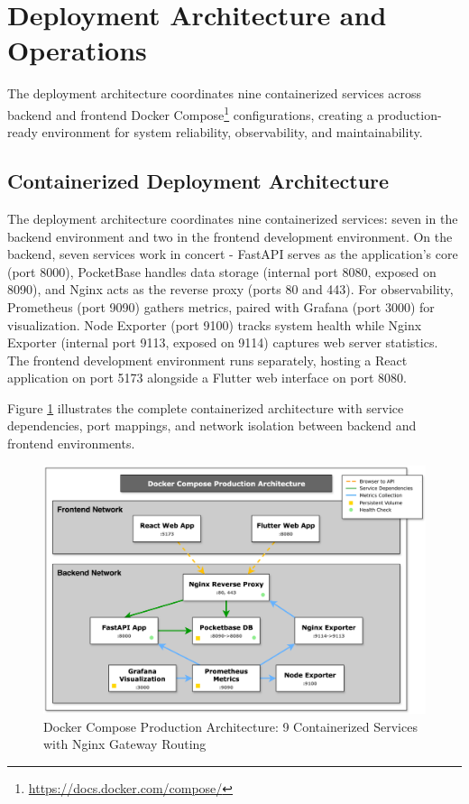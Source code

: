 
\section{Deployment Architecture and Operations} \label{section:deployment_operations}

The deployment architecture coordinates nine containerized services across backend and frontend Docker Compose\footnote{\url{https://docs.docker.com/compose/}} configurations, creating a production-ready environment for system reliability, observability, and maintainability.

\subsection{Containerized Deployment Architecture} \label{subsection:container_deployment}

The deployment architecture coordinates nine containerized services: seven in the backend environment and two in the frontend development environment. On the backend, seven services work in concert - FastAPI serves as the application's core (port 8000), PocketBase handles data storage (internal port 8080, exposed on 8090), and Nginx acts as the reverse proxy (ports 80 and 443). For observability, Prometheus (port 9090) gathers metrics, paired with Grafana (port 3000) for visualization. Node Exporter (port 9100) tracks system health while Nginx Exporter (internal port 9113, exposed on 9114) captures web server statistics. The frontend development environment runs separately, hosting a React application on port 5173 alongside a Flutter web interface on port 8080.

Figure \ref{fig:docker_architecture} illustrates the complete containerized architecture with service dependencies, port mappings, and network isolation between backend and frontend environments.

\begin{figure}[htbp]
\centering
\includegraphics[width=\textwidth]{figs/chapter4/docker_architecture_diagram.png}
\caption{Docker Compose Production Architecture: 9 Containerized Services with Nginx Gateway Routing}
\label{fig:docker_architecture}
\end{figure}

